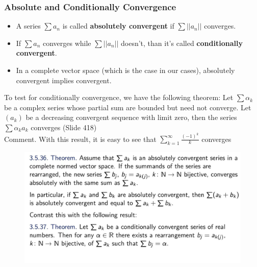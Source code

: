 \documentclass{beamer}
\begin{document}
\begin{frame}
    \frametitle{Absolute and Conditionally Convergence}
    \hspace{1em}
    \begin{itemize}
        \item A series $\sum a_n$ is called \textbf{absolutely convergent} if $\sum ||a_n||$ converges.
        \item If $\sum a_n$ converges while $\sum ||a_n||$ doesn’t, than it’s called \textbf{conditionally convergent}.
        \item In a complete vector space (which is the case in our cases), absolutely
              convergent implies convergent.
    \end{itemize}
    To test for conditionally convergence, we have the following theorem:
    \hspace{1em}Let $\sum \alpha_k$ be a complex series whose partial sum are bounded but need not converge.
    Let $(a_k)$ be a decreasing convergent sequence with limit zero, then the series $\sum \alpha_k a_k$ converges (Slide 418)
    \\ \vspace{1em}
    Comment. With this result, it is easy to see that $\sum_{k=1}^\infty \frac{(-1)^k}{k}$ converges

\end{frame}

\begin{frame}
    \begin{figure}[htbp]
        \centering
        \includegraphics[width=12cm]{rearrange.jpg}
    \end{figure}
\end{frame}
\end{document}
